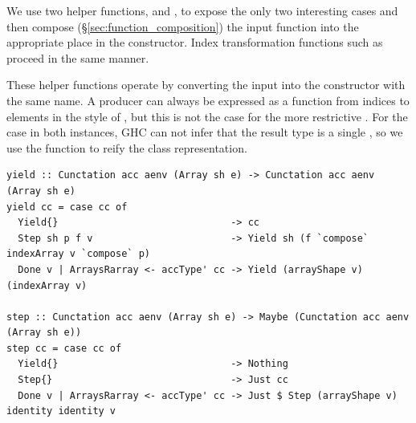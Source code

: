 We use two helper functions,  and , to expose the only
two interesting cases and then compose (\S\ref{sec:function_composition}) the
input function  into the appropriate place in the constructor. Index
transformation functions such as  proceed in the same manner.

These helper functions operate by converting the input  into
the constructor with the same name. A producer can always be expressed as a
function from indices to elements in the style of , but this is not
the case for the more restrictive . For the  case in both
instances, GHC can not infer that the result type is a single , so
we use the  function to reify the  class
representation.
%
\begin{lstlisting}[style=haskell]
yield :: Cunctation acc aenv (Array sh e) -> Cunctation acc aenv (Array sh e)
yield cc = case cc of
  Yield{}                              -> cc
  Step sh p f v                        -> Yield sh (f `compose` indexArray v `compose` p)
  Done v | ArraysRarray <- accType' cc -> Yield (arrayShape v) (indexArray v)

step :: Cunctation acc aenv (Array sh e) -> Maybe (Cunctation acc aenv (Array sh e))
step cc = case cc of
  Yield{}                              -> Nothing
  Step{}                               -> Just cc
  Done v | ArraysRarray <- accType' cc -> Just $ Step (arrayShape v) identity identity v
\end{lstlisting}

